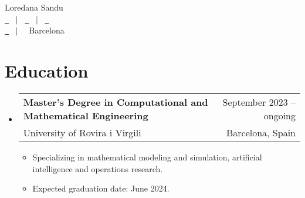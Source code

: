 \documentclass[a4paper,10pt]{article}
\makeatletter
\newcommand{\resumeQuadHeading}[4]{
  \item
  \begin{tabular*}{0.96\textwidth}[t]{l@{\extracolsep{\fill}}r}
    \textbf{#1} & \small #2 \\
    \small#3 & \small #4 \\
  \end{tabular*}
}
\newcommand{\resumeHeadingListStart}{
  \begin{itemize}[leftmargin=0.15in, label={}]
}
\newcommand{\resumeHeadingListEnd}{\end{itemize}}
\makeatother
\begin{document}
\begin{center}
    {\Huge Loredana Sandu \vspace{2pt}} \\[1.25pc]
    \href{https://loredanasandu.github.io/}{\faLink \ } \, $|$ \, %
    \href{https://www.linkedin.com/in/loredana-sandu/}{\faLinkedinSquare \ } \, $|$ \, %
    \href{https://www.github.com/loredanasandu}{\faGithub \ } \\[0.1pc] %
    \href{mailto:loredana.sandu@estudiants.urv.cat}{\faEnvelope \ } \, $|$ \, %
    \faHome \ Barcelona \\[1.5pc] %
\end{center}




\section{Education}
  \resumeHeadingListStart{}
  \resumeQuadHeading{Master's Degree in Computational and Mathematical Engineering}{September 2023 – ongoing}
  {University of Rovira i Virgili}{Barcelona, Spain}
  \begin{itemize}[leftmargin=3em, itemsep=0.1em, topsep=2pt]
      \item \small Specializing in mathematical modeling and simulation, artificial intelligence and operations research.
      \item \small Expected graduation date: June 2024.
  \end{itemize}
  \resumeHeadingListEnd{}
\end{document}
